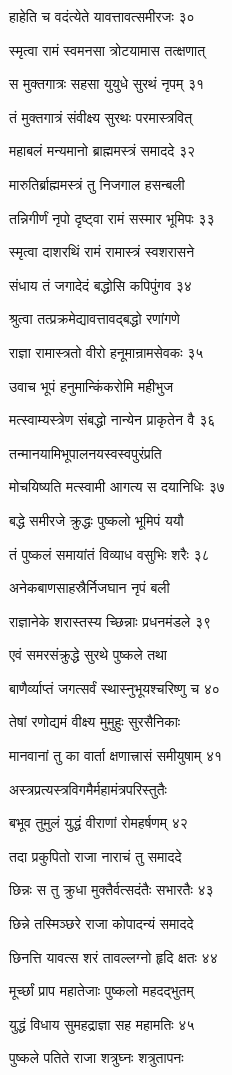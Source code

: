 हाहेति च वदंत्येते यावत्तावत्समीरजः ३०

स्मृत्वा रामं स्वमनसा त्रोटयामास तत्क्षणात्

स मुक्तगात्रः सहसा युयुधे सुरथं नृपम् ३१

तं मुक्तगात्रं संवीक्ष्य सुरथः परमास्त्रवित्

महाबलं मन्यमानो ब्राह्ममस्त्रं समाददे ३२

मारुतिर्ब्राह्ममस्त्रं तु निजगाल हसन्बली

तन्निगीर्णं नृपो दृष्ट्वा रामं सस्मार भूमिपः ३३

स्मृत्वा दाशरथिं रामं रामास्त्रं स्वशरासने

संधाय तं जगादेदं बद्धोसि कपिपुंगव ३४

श्रुत्वा तत्प्रक्रमेद्यावत्तावद्बद्धो रणांगणे

राज्ञा रामास्त्रतो वीरो हनूमान्रामसेवकः ३५

उवाच भूपं हनुमान्किंकरोमि महीभुज

मत्स्वाम्यस्त्रेण संबद्धो नान्येन प्राकृतेन वै ३६

तन्मानयामिभूपालनयस्वस्वपुरंप्रति

मोचयिष्यति मत्स्वामी आगत्य स दयानिधिः ३७

बद्धे समीरजे क्रुद्धः पुष्कलो भूमिपं ययौ

तं पुष्कलं समायांतं विव्याध वसुभिः शरैः ३८

अनेकबाणसाहस्रैर्निजघान नृपं बली

राज्ञानेके शरास्तस्य च्छिन्नाः प्रधनमंडले ३९

एवं समरसंक्रुद्धे सुरथे पुष्कले तथा

बाणैर्व्याप्तं जगत्सर्वं स्थास्नुभूयश्चरिष्णु च ४०

तेषां रणोद्यमं वीक्ष्य मुमुहुः सुरसैनिकाः

मानवानां तु का वार्ता क्षणात्त्रासं समीयुषाम् ४१

अस्त्रप्रत्यस्त्रविगमैर्महामंत्रपरिस्तुतैः

बभूव तुमुलं युद्धं वीराणां रोमहर्षणम् ४२

तदा प्रकुपितो राजा नाराचं तु समाददे

छिन्नः स तु क्रुधा मुक्तैर्वत्सदंतैः सभारतैः ४३

छिन्ने तस्मिञ्छरे राजा कोपादन्यं समाददे

छिनत्ति यावत्स शरं तावल्लग्नो हृदि क्षतः ४४

मूर्च्छां प्राप महातेजाः पुष्कलो महदद्भुतम्

युद्धं विधाय सुमहद्राज्ञा सह महामतिः ४५

पुष्कले पतिते राजा शत्रुघ्नः शत्रुतापनः

